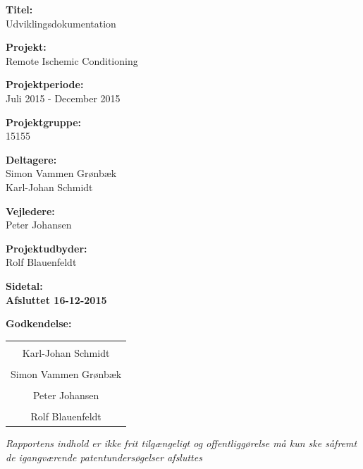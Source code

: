 \begin{minipage}[t]{0.48\textwidth}
\textbf{Titel:} \\[5pt]\bigskip\hspace{2ex}
Udviklingsdokumentation

\textbf{Projekt:} \\[5pt]\bigskip\hspace{2ex}
Remote Ischemic Conditioning

\textbf{Projektperiode:} \\[5pt]\bigskip\hspace{2ex}
Juli 2015 - December 2015

\textbf{Projektgruppe:} \\[5pt]\bigskip\hspace{2ex}
15155

\textbf{Deltagere:} \\[5pt]\hspace*{2ex}
Simon Vammen Grønbæk\\\hspace*{2ex}
Karl-Johan Schmidt \\\hspace*{2ex}


\textbf{Vejledere:} \\[5pt]\hspace*{2ex}
Peter Johansen \\\bigskip\hspace{2ex}

\textbf{Projektudbyder:} \\[5pt]\hspace*{2ex}
Rolf Blauenfeldt\\\bigskip\hspace{2ex}
\vspace*{4cm}


\textbf{Sidetal: \pageref{lastPage}} \\
\textbf{Afsluttet 16-12-2015}

\end{minipage}
\hfill
\begin{minipage}[t]{0.483\textwidth}
	\textbf{Godkendelse:}\vspace{1cm}
\begin{table}[H]
	\centering
	\begin{tabular}{c}
		\underline{\phantom{mmmmmmmmmmmmmm}}  \\
		Karl-Johan Schmidt \vspace{2cm}\\
		\underline{\phantom{mmmmmmmmmmmmmm}} \\
		Simon Vammen Grønbæk \vspace{2cm}	\\
		\underline{\phantom{mmmmmmmmmmmmmm}} \\
		Peter Johansen \vspace{2cm}	\\
		\underline{\phantom{mmmmmmmmmmmmmm}} \\
		Rolf Blauenfeldt \vspace{2cm}	\\
	\end{tabular}
\end{table}
\end{minipage}

\vfill
{\footnotesize\itshape Rapportens indhold er ikke frit tilgængeligt og offentliggørelse må kun ske såfremt de igangværende patentundersøgelser afsluttes}
